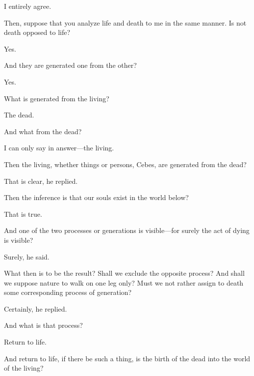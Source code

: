 \documentclass[11pt,letter]{article}
\begin{document}
\par  I entirely agree.

\par  Then, suppose that you analyze life and death to me in the same manner. Is not death opposed to life?

\par  Yes.

\par  And they are generated one from the other?

\par  Yes.

\par  What is generated from the living?

\par  The dead.

\par  And what from the dead?

\par  I can only say in answer—the living.

\par  Then the living, whether things or persons, Cebes, are generated from the dead?

\par  That is clear, he replied.

\par  Then the inference is that our souls exist in the world below?

\par  That is true.

\par  And one of the two processes or generations is visible—for surely the act of dying is visible?

\par  Surely, he said.

\par  What then is to be the result? Shall we exclude the opposite process? And shall we suppose nature to walk on one leg only? Must we not rather assign to death some corresponding process of generation?

\par  Certainly, he replied.

\par  And what is that process?

\par  Return to life.

\par  And return to life, if there be such a thing, is the birth of the dead into the world of the living?
\end{document}
